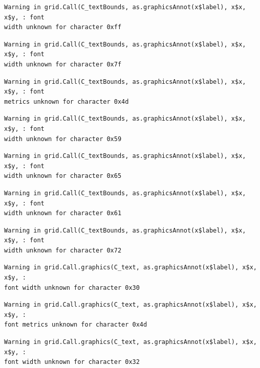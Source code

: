 \documentclass[
  letterpaper,
]{scrbook}
\begin{document}
\begin{verbatim}
Warning in grid.Call(C_textBounds, as.graphicsAnnot(x$label), x$x, x$y, : font
width unknown for character 0xff
\end{verbatim}

\begin{verbatim}
Warning in grid.Call(C_textBounds, as.graphicsAnnot(x$label), x$x, x$y, : font
width unknown for character 0x7f
\end{verbatim}

\begin{verbatim}
Warning in grid.Call(C_textBounds, as.graphicsAnnot(x$label), x$x, x$y, : font
metrics unknown for character 0x4d
\end{verbatim}

\begin{verbatim}
Warning in grid.Call(C_textBounds, as.graphicsAnnot(x$label), x$x, x$y, : font
width unknown for character 0x59
\end{verbatim}

\begin{verbatim}
Warning in grid.Call(C_textBounds, as.graphicsAnnot(x$label), x$x, x$y, : font
width unknown for character 0x65
\end{verbatim}

\begin{verbatim}
Warning in grid.Call(C_textBounds, as.graphicsAnnot(x$label), x$x, x$y, : font
width unknown for character 0x61
\end{verbatim}

\begin{verbatim}
Warning in grid.Call(C_textBounds, as.graphicsAnnot(x$label), x$x, x$y, : font
width unknown for character 0x72
\end{verbatim}

\begin{verbatim}
Warning in grid.Call.graphics(C_text, as.graphicsAnnot(x$label), x$x, x$y, :
font width unknown for character 0x30
\end{verbatim}

\begin{verbatim}
Warning in grid.Call.graphics(C_text, as.graphicsAnnot(x$label), x$x, x$y, :
font metrics unknown for character 0x4d
\end{verbatim}

\begin{verbatim}
Warning in grid.Call.graphics(C_text, as.graphicsAnnot(x$label), x$x, x$y, :
font width unknown for character 0x32
\end{verbatim}
\end{document}
